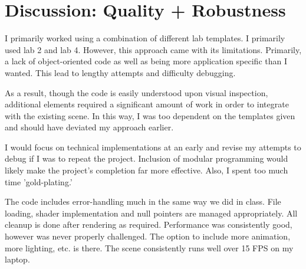 \newpage
\chapter{Discussion: Quality + Robustness}
I primarily worked using a combination of different lab templates. I primarily used lab 2 and lab 4. However, this approach came with its limitations. Primarily, a lack of object-oriented code as well as being more application specific than I wanted. This lead to lengthy attempts and difficulty debugging. 

As a result, though the code is easily understood upon visual inspection, additional elements required a significant amount of work in order to integrate with the existing scene. In this way, I was too dependent on the templates given and should have deviated my approach earlier.

I would focus on technical implementations at an early and revise my attempts to debug if I was to repeat the project. Inclusion of modular programming would likely make the project's completion far more effective. Also, I spent too much time 'gold-plating.'

The code includes error-handling much in the same way we did in class. File loading, shader implementation and null pointers are managed appropriately. All cleanup is done after rendering as required. Performance was consistently good, however was never properly challenged. The option to include more animation, more lighting, etc. is there. The scene consistently runs well over 15 FPS on my laptop.